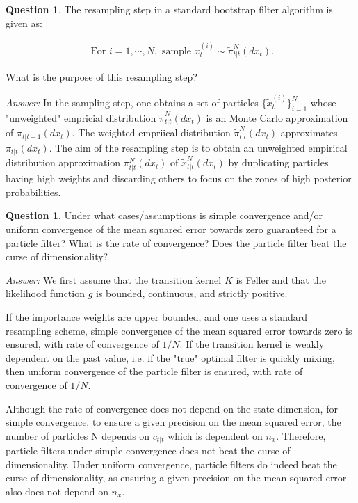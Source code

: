 \documentclass{article}
\theoremstyle{definition}
\newtheorem{question}[thm]{Question}
\newenvironment{answer}{\noindent\textit{Answer:}}{}
\begin{document}
\begin{question}
    The resampling step in a standard bootstrap filter algorithm is given as:

\begin{align}
    \text{ For } i = 1, \cdots, N, \text{ sample } x_t^{(i)} \sim \tilde{\pi}_{t|t}^N(dx_t).
\end{align}

What is the purpose of this resampling step?
\end{question}

\begin{answer}
    In the sampling step, one obtains a set of particles $\{\tilde{x}_t^{(i)}\}^N_{i=1}$ whose "unweighted" empricial distribution $\tilde{\pi}_{t|t}^N(dx_t)$ is an Monte Carlo approximation of $\pi_{t|t-1}(dx_t)$. The weighted empriical distribution $\tilde{\pi}_{t|t}^{N}(dx_t)$ approximates $\pi_{t|t}(dx_t)$. The aim of the resampling step is to obtain an unweighted empirical distribution approximation $\pi_{t|t}^N(dx_t)$ of $\tilde{x}_{t|t}^N(dx_t)$ by duplicating particles having high weights and discarding others to focus on the zones of high posterior probabilities.
\end{answer}

\begin{question}
    Under what cases/assumptions is simple convergence and/or uniform convergence of the mean squared error towards zero guaranteed for a particle filter?  What is the rate of convergence? Does the particle filter beat the curse of dimensionality?
\end{question}

\begin{answer}
    We first assume that the transition kernel $K$ is Feller and that the likelihood function $g$ is bounded, continuous, and strictly positive.

If the importance weights are upper bounded, and one uses a standard resampling scheme, simple convergence of the mean squared error towards zero is ensured, with rate of convergence of $1/N$. If the transition kernel is weakly dependent on the past value, i.e. if the "true" optimal filter is quickly mixing, then uniform convergence of the particle filter is ensured, with rate of convergence of $1/N$.

Although the rate of convergence does not depend on the state dimension, for simple convergence, to ensure a given precision on the mean squared error, the number of particles N depends on $c_{t|t}$ which is dependent on $n_x$. Therefore, particle filters under simple convergence does not beat the curse of dimensionality. Under uniform convergence, particle filters do indeed beat the curse of dimensionality, as ensuring a given precision on the mean squared error also does not depend on $n_x$.
\end{answer}
\end{document}
